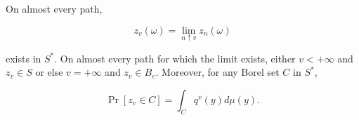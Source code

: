 On almost every path,

$$z_v(\omega) = \lim_{n \uparrow v} z_n(\omega)$$

exists in $S^*$. On almost every path for which the limit exists, either $v < +\infty$ and $z_v \in S$ or else $v = +\infty$ and $z_v \in B_e$. Moreover, for any Borel set $C$ in $S^*$,

$$\Pr[z_v \in C] = \int_C q^v(y) d\mu(y).$$
